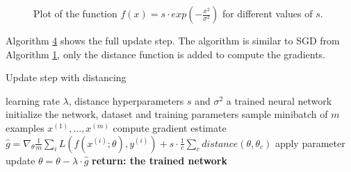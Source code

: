 \begin{figure}[h]%
    \centering
    \begin{center}
         
         \caption{Plot of the function $f(x)=s\cdot exp(-\frac{x^2}{\sigma^2})$ for different values of $s$.}
         \label{fig:Gaussian_strength}
    \end{center}
\end{figure}

Algorithm \hyperlink{alg:Distancing_Update}{4} shows the full update step. The algorithm is
similar to SGD from Algorithm \hyperlink{alg:SGD}{1}, only the distance function is added to
compute the gradients.

\begin{algorithm}
    \hypertarget{alg:Distancing_Update}{}
    \begin{algorithmic}[1]
        \caption{Update step with distancing}
        \REQUIRE learning rate $\lambda$, distance hyperparameters $s$ and $\sigma^2$
        \ENSURE a trained neural network
        \STATE initialize the network, dataset and training parameters
            \STATE sample minibatch of $m$ examples ${x^{(1)}, ... ,x^{(m)}}$
            \STATE compute gradient estimate $\hat{g}=\nabla_\theta \frac{1}{m} \sum_i L(f(x^{(i)};\theta),y^{(i)})+ s \cdot \frac{1}{c}\sum_c distance(\theta , \theta_c)$
            \STATE apply parameter update $\theta=\theta-\lambda\cdot\hat{g}$
        \ENDWHILE
        \STATE \textbf{return: the trained network}
    \end{algorithmic}
\end{algorithm}

